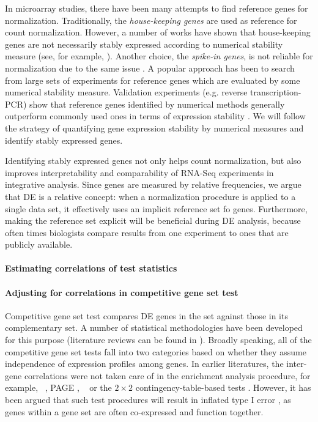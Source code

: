 In microarray studies, there have been many attempts to find reference genes for normalization.
Traditionally, the \textit{house-keeping genes}  are used as reference for count normalization.
However, a number of works have shown that house-keeping genes are not necessarily stably expressed
according to numerical stability measure (see, for example,
\cite{czechowski2005genome,huggett2005real}). Another choice, the \textit{spike-in genes}, is not
reliable for normalization due to the same issue \citep{risso2014nat}. A popular approach has been
to search from large sets of experiments for reference genes
\citep{czechowski2005genome,dekkers2012identification,frericks2008toolbox,gur2009identification,stamova2009identification}
which are evaluated by some numerical stability measure. Validation experiments (e.g. reverse
transcription-PCR) show that reference genes identified by numerical methods generally outperform
commonly used ones in terms of expression stability \citep{czechowski2005genome,hruz2011refgenes}.
We will follow the strategy of quantifying gene expression stability by numerical measures and
identify stably expressed genes.

Identifying stably expressed genes not only helps count normalization, but also improves
interpretability and comparability of RNA-Seq experiments in integrative analysis. Since genes are
measured by relative frequencies, we argue that DE is a relative concept: when a normalization
procedure is applied to a single data set, it effectively uses an implicit reference set fo genes.
Furthermore, making the reference set explicit will be beneficial during DE analysis, because often times biologists compare results from one experiment to ones that are publicly
available. 

\paragraph{Estimating correlations of test statistics}

\paragraph{Adjusting for correlations in competitive gene set test}
Competitive gene set test compares DE genes in the set against those in its complementary set. A
number of
statistical methodologies have been developed for this purpose (literature reviews can be found in
\cite{huang2009bioinformatics,khatri2012ten, mishra2014gene}). Broadly speaking, all of the
competitive gene set tests fall into two categories based on whether they assume independence of
expression profiles among genes. In earlier literatures, the inter-gene correlations were not taken
care of in the enrichment analysis procedure, for example, \gent~\citep{tian2005discovering}, PAGE
\citep{kim2005page}, \genr~\citep{michaud2008integrative} or the $2\times 2$ contingency-table-based
tests \cite{alexa2010topgo, huang2007david,ye2006wego}. However, it has been argued that such test
procedures will result in inflated type I error \citep{efron2007testing,goeman2007analyzing,
	gatti2010heading,wu2012camera,yaari2013quantitative}, as genes within a gene set are often
co-expressed and function together.

